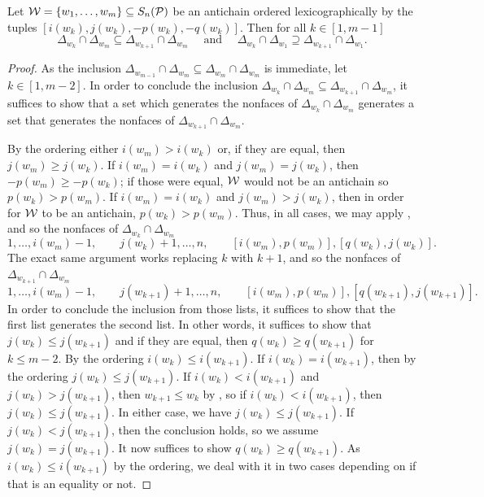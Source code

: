\begin{corollary}
    \label{lem:antichain ordering}
    Let $\mathcal{W} = \{w_1,\dots,w_m\} \subseteq S_n(\mathcal{P})$ be an antichain ordered lexicographically by the tuples \([i(w_k),j(w_k),-p(w_k),-q(w_k)]\).
    Then for all $k\in [1,m-1]$
    \[\Delta_{w_k}\cap \Delta_{w_m}\subseteq \Delta_{w_{k+1}}\cap \Delta_{w_m}\quad\text{ and }\quad \Delta_{w_k}\cap \Delta_{w_1}\supseteq \Delta_{w_{k+1}}\cap \Delta_{w_1}.\]
\end{corollary}
\begin{proof}
    As the inclusion $\Delta_{w_{m-1}}\cap \Delta_{w_m} \subseteq \Delta_{w_m}\cap \Delta_{w_m}$ is immediate, let $k\in[1,m-2]$.
    In order to conclude the inclusion $\Delta_{w_k}\cap \Delta_{w_m}\subseteq \Delta_{w_{k+1}}\cap \Delta_{w_m}$, it suffices to show that a set which generates the nonfaces of $\Delta_{w_k}\cap \Delta_{w_m}$ generates a set that generates the nonfaces of $\Delta_{w_{k+1}}\cap \Delta_{w_m}$.
    
    By the ordering either $i(w_m)> i(w_k)$ or, if they are equal, then $j(w_m)\geq j(w_k)$.
    If $i(w_m)= i(w_k)$ and $j(w_m)= j(w_k)$, then $-p(w_m)\geq -p(w_k)$; if those were equal, $\mathcal{W}$ would not be an antichain so $p(w_k)> p(w_m)$.
    If $i(w_m)= i(w_k)$ and $j(w_m)> j(w_k)$, then in order for $\mathcal{W}$ to be an antichain, $p(w_k)> p(w_m)$.
    Thus, in all cases, we may apply , and so the nonfaces of $\Delta_{w_k}\cap \Delta_{w_m}$
    \[1,\dots,i(w_m)-1,\qquad j(w_k)+1,\dots,n,\qquad [i(w_m),p(w_m)],  [q(w_k),j(w_k)].\]
    The exact same argument works replacing $k$ with $k+1$, and so the  nonfaces of $\Delta_{w_{k+1}}\cap \Delta_{w_m}$
    \[1,\dots,i(w_m)-1,\qquad j(w_{k+1})+1,\dots,n,\qquad [i(w_m),p(w_m)],  [q(w_{k+1}),j(w_{k+1})].\]
    In order to conclude the inclusion from those lists, it suffices to show that the first list generates the second list.
    In other words, it suffices to show that $j(w_k)\leq j(w_{k+1})$ and if they are equal, then $q(w_k)\geq q(w_{k+1})$ for $k\leq m-2$.
    By the ordering $i(w_k)\leq i(w_{k+1})$.
    If $i(w_k)= i(w_{k+1})$, then by the ordering $j(w_k)\leq j(w_{k+1})$.
    If $i(w_k)< i(w_{k+1})$ and $j(w_k)>j(w_{k+1})$, then $w_{k+1}\leq w_k$ by , so if $i(w_k)< i(w_{k+1})$, then $j(w_k)\leq j(w_{k+1})$.
    In either case, we have $j(w_k)\leq j(w_{k+1})$.
    If $j(w_k)< j(w_{k+1})$, then the conclusion holds, so we assume $j(w_k)= j(w_{k+1})$.
    It now suffices to show $q(w_k)\geq q(w_{k+1})$.
    As $i(w_k)\leq i(w_{k+1})$ by the ordering, we deal with it in two cases depending on if that is an equality or not.
    

\end{proof}
